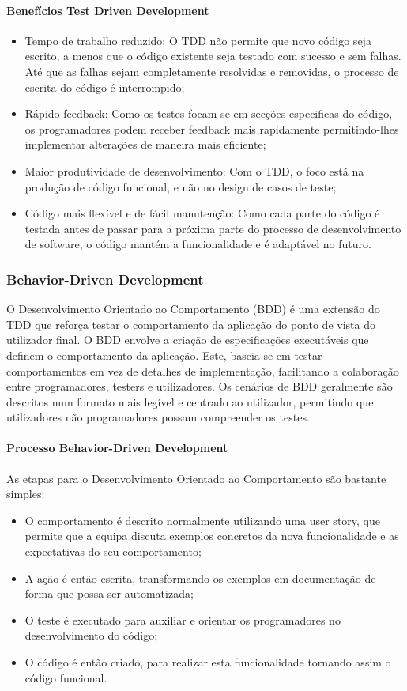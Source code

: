\documentclass[a4paper,12pt]{article} %
\begin{document}
\paragraph{Benefícios Test Driven Development}
\begin{itemize}
	\item Tempo de trabalho reduzido: O TDD não permite que novo código seja escrito, a menos que o código existente seja testado com sucesso e sem falhas. Até que as falhas sejam completamente resolvidas e removidas, o processo de escrita do código é interrompido;
	\item Rápido feedback: Como os testes focam-se em secções especificas do código, os programadores podem receber feedback mais rapidamente permitindo-lhes implementar alterações de maneira mais eficiente;
	\item Maior produtividade de desenvolvimento: Com o TDD, o foco está na produção de código funcional, e não no design de casos de teste;
	\item Código mais flexível e de fácil manutenção: Como cada parte do código é testada antes de passar para a próxima parte do processo de desenvolvimento de software, o código mantém a funcionalidade e é adaptável no futuro.
\end{itemize}

\newpage
\subsubsection{Behavior-Driven Development}
O Desenvolvimento Orientado ao Comportamento (BDD) é uma extensão do TDD que reforça testar o comportamento da aplicação do ponto de vista do utilizador final. O BDD envolve a criação de especificações executáveis que definem o comportamento da aplicação. Este, baseia-se em testar comportamentos em vez de detalhes de implementação, facilitando a colaboração entre programadores, testers e utilizadores. Os cenários de BDD geralmente são descritos num formato mais legível e centrado ao utilizador, permitindo que utilizadores não programadores possam compreender os testes.

\paragraph{Processo Behavior-Driven Development}
As etapas para o Desenvolvimento Orientado ao Comportamento são bastante simples:

\begin{itemize}
	\item O comportamento é descrito normalmente utilizando uma user story, que permite que a equipa discuta exemplos concretos da nova funcionalidade e as expectativas do seu comportamento;
	\item A ação é então escrita, transformando os exemplos em documentação de forma que possa ser automatizada;
	\item O teste é executado para auxiliar e orientar os programadores no desenvolvimento do código;
	\item O código é então criado, para realizar esta funcionalidade tornando assim o código funcional.
\end{itemize}
\end{document}
